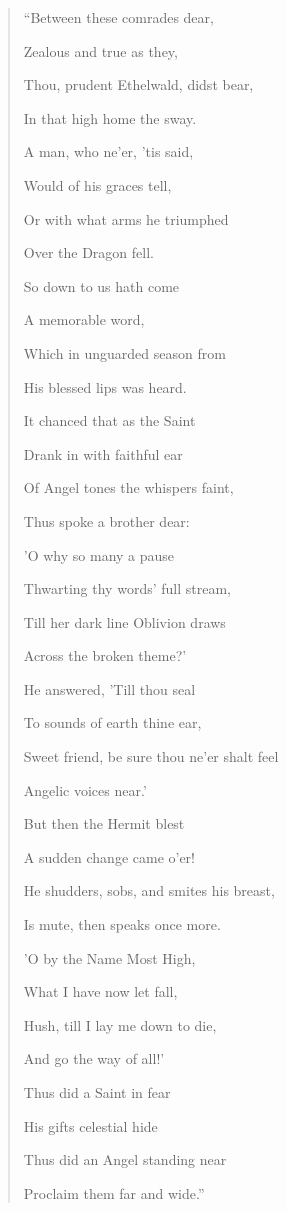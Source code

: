 \begin{quote}

``Between these comrades dear,

Zealous and true as they,

Thou, prudent Ethelwald, didst bear,

In that high home the sway.

A man, who ne'er, 'tis said,

Would of his graces tell,

Or with what arms he triumphed

Over the Dragon fell.

So down to us hath come

A memorable word,

Which in unguarded season from

His blessed lips was heard.

It chanced that as the Saint

Drank in with faithful ear

Of Angel tones the whispers faint,

Thus spoke a brother dear:

'O why so many a pause

Thwarting thy words' full stream,

Till her dark line Oblivion draws

Across the broken theme?'

He answered, 'Till thou seal

To sounds of earth thine ear,

Sweet friend, be sure thou ne'er shalt feel

Angelic voices near.'

But then the Hermit blest

A sudden change came o'er!

He shudders, sobs, and smites his breast,

Is mute, then speaks once more.

'O by the Name Most High,

What I have now let fall,

Hush, till I lay me down to die,

And go the way of all!'

Thus did a Saint in fear

His gifts celestial hide

Thus did an Angel standing near

Proclaim them far and wide.''

\end{quote}

